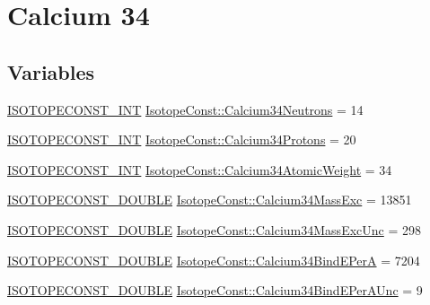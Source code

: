 \hypertarget{group___isotope_const-_calcium-_ca34}{}\section{Calcium 34}
\label{group___isotope_const-_calcium-_ca34}
\subsection*{Variables}
\begin{DoxyCompactItemize}
\item 
\mbox{\hyperlink{group___isotope_const-_macros_ga5f18360b3e99483a35c32d789e62621c}{I\+S\+O\+T\+O\+P\+E\+C\+O\+N\+S\+T\+\_\+\+I\+NT}} \mbox{\hyperlink{group___isotope_const-_calcium-_ca34_ga16f135adbb62ced75e020855a0861ba5}{Isotope\+Const\+::\+Calcium34\+Neutrons}} = 14
\item 
\mbox{\hyperlink{group___isotope_const-_macros_ga5f18360b3e99483a35c32d789e62621c}{I\+S\+O\+T\+O\+P\+E\+C\+O\+N\+S\+T\+\_\+\+I\+NT}} \mbox{\hyperlink{group___isotope_const-_calcium-_ca34_ga40ee8809e019728889a64422210d047f}{Isotope\+Const\+::\+Calcium34\+Protons}} = 20
\item 
\mbox{\hyperlink{group___isotope_const-_macros_ga5f18360b3e99483a35c32d789e62621c}{I\+S\+O\+T\+O\+P\+E\+C\+O\+N\+S\+T\+\_\+\+I\+NT}} \mbox{\hyperlink{group___isotope_const-_calcium-_ca34_ga920f9810bf7ef2222634a4a65a197c4d}{Isotope\+Const\+::\+Calcium34\+Atomic\+Weight}} = 34
\item 
\mbox{\hyperlink{group___isotope_const-_macros_ga8f45a7272ce02c0b4c65c44636ed719a}{I\+S\+O\+T\+O\+P\+E\+C\+O\+N\+S\+T\+\_\+\+D\+O\+U\+B\+LE}} \mbox{\hyperlink{group___isotope_const-_calcium-_ca34_ga1622962df6c1f5673a1ed90e7bf483ba}{Isotope\+Const\+::\+Calcium34\+Mass\+Exc}} = 13851
\item 
\mbox{\hyperlink{group___isotope_const-_macros_ga8f45a7272ce02c0b4c65c44636ed719a}{I\+S\+O\+T\+O\+P\+E\+C\+O\+N\+S\+T\+\_\+\+D\+O\+U\+B\+LE}} \mbox{\hyperlink{group___isotope_const-_calcium-_ca34_ga977b5e78677e6defbd3dbb15b1dec627}{Isotope\+Const\+::\+Calcium34\+Mass\+Exc\+Unc}} = 298
\item 
\mbox{\hyperlink{group___isotope_const-_macros_ga8f45a7272ce02c0b4c65c44636ed719a}{I\+S\+O\+T\+O\+P\+E\+C\+O\+N\+S\+T\+\_\+\+D\+O\+U\+B\+LE}} \mbox{\hyperlink{group___isotope_const-_calcium-_ca34_ga7ee43b0560f9b77c8fc594333c5a5f28}{Isotope\+Const\+::\+Calcium34\+Bind\+E\+PerA}} = 7204
\item 
\mbox{\hyperlink{group___isotope_const-_macros_ga8f45a7272ce02c0b4c65c44636ed719a}{I\+S\+O\+T\+O\+P\+E\+C\+O\+N\+S\+T\+\_\+\+D\+O\+U\+B\+LE}} \mbox{\hyperlink{group___isotope_const-_calcium-_ca34_ga810129adbe3baa13c6fe9bb0d39de792}{Isotope\+Const\+::\+Calcium34\+Bind\+E\+Per\+A\+Unc}} = 9

\end{DoxyCompactItemize}
